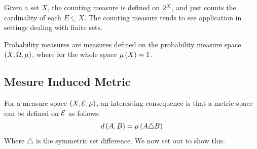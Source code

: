 \begin{example}
  Given a set \(X\),
  the counting measure is defined on \(2^{X}\),
  and just counts the cardinality of each \(E \subseteq X\).
  The counting measure tends to see application in settings
  dealing with finite sets.
\end{example}

\begin{example}
  Probability measures are measures
  defined on the probability measure space
  \(\left(X, \Omega, \mu\right)\),
  where for the whole space \(\mu\left(X\right) = 1\).
\end{example}



\subsection{Mesure Induced Metric}

For a measure space \(\left(X, \mathcal{E}, \mu\right)\),
an interesting consequence is that a
metric space can be defined on \(\mathcal{E}\)
as follows:
\begin{align*}
  d\left(A, B\right) = \mu\left(A \triangle B\right)
\end{align*}
Where \(\triangle\) is the symmetric set difference.
We now set out to show this.


